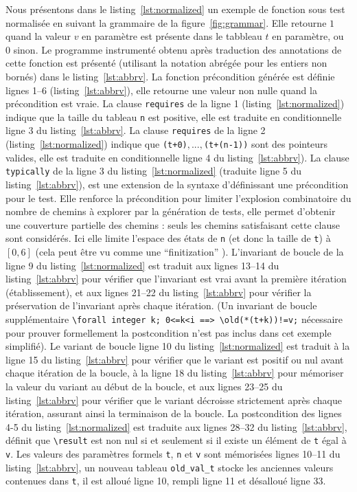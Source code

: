 Nous présentons dans le listing~\ref{lst:normalized} un exemple de fonction sous
test normalisée en suivant la grammaire de la figure~\ref{fig:grammar}.
Elle retourne $1$ quand la valeur $v$ en paramètre est présente dans le tabbleau
$t$ en paramètre, ou $0$ sinon.
Le programme instrumenté obtenu après traduction des annotations de cette
fonction est présenté (utilisant la notation abrégée pour les entiers non
bornés) dans le listing~\ref{lst:abbrv}.
La fonction précondition générée est définie lignes 1--6
(listing~\ref{lst:abbrv}), elle retourne une valeur non nulle quand la
précondition est vraie.
La clause \lstinline'requires' de la ligne 1 (listing~\ref{lst:normalized})
indique que la taille du tableau \lstinline|n| est positive, elle est traduite
en conditionnelle ligne 3 du listing~\ref{lst:abbrv}.
La clause \lstinline'requires' de la ligne 2 (listing~\ref{lst:normalized}) 
indique que \lstinline|(t+0)|$, ..., $\lstinline|(t+(n-1))| sont des pointeurs
valides, elle est traduite en conditionnelle ligne 4 du
listing~\ref{lst:abbrv}).
La clause \lstinline'typically' de la ligne 3 du listing~\ref{lst:normalized}
(traduite ligne 5 du listing~\ref{lst:abbrv}), est une extension de la syntaxe
d'\eacsl définissant une précondition pour le test.
Elle renforce la précondition pour limiter l'explosion combinatoire du nombre de
chemins à explorer par la génération de tests, elle permet d'obtenir une
couverture partielle des chemins : seuls les chemins satisfaisant cette clause
sont considérés.
Ici elle limite l'espace des états de \lstinline'n' (et donc la taille de
\lstinline't') à $[0, 6]$ (cela peut être vu comme une ``finitization''
\cite{Korat}).
L'invariant de boucle de la ligne 9 du listing~\ref{lst:normalized} est traduit
aux lignes 13--14 du listing~\ref{lst:abbrv} pour vérifier que l'invariant est
vrai avant la première itération (établissement), et aux lignes 21--22 du
listing~\ref{lst:abbrv} pour vérifier la préservation de l'invariant après
chaque itération.
(Un invariant de boucle supplémentaire 
\lstinline|\forall integer k; 0<=k<i ==> \old(*(t+k))!=v;|
nécessaire pour prouver formellement la postcondition n'est pas inclus dans cet
exemple simplifié).
Le variant de boucle ligne 10 du listing~\ref{lst:normalized} est traduit à la
ligne 15 du listing~\ref{lst:abbrv} pour vérifier que le variant est positif ou
nul avant chaque itération de la boucle, à la ligne 18 du
listing~\ref{lst:abbrv} pour mémoriser la valeur du variant au début de la
boucle, et aux lignes 23--25 du listing~\ref{lst:abbrv} pour vérifier que le
variant décroisse strictement après chaque itération, assurant ainsi la
terminaison de la boucle.
La postcondition des lignes 4-5 du listing~\ref{lst:normalized} est traduite aux
lignes 28--32 du listing~\ref{lst:abbrv}, définit que \lstinline|\result| est
non nul si et seulement si il existe un élément de \lstinline|t| égal à
\lstinline|v|.
Les valeurs des paramètres formels \lstinline|t|, \lstinline|n| et \lstinline|v|
sont mémorisées lignes 10--11 du listing~\ref{lst:abbrv}, un nouveau tableau
\lstinline|old_val_t| stocke les anciennes valeurs contenues dans \lstinline|t|,
il est alloué ligne 10, rempli ligne 11 et désalloué ligne 33.


